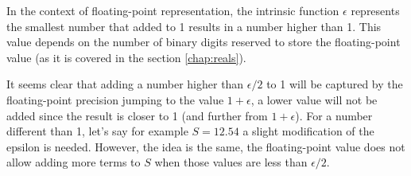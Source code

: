 In the context of floating-point representation, the intrinsic function $\epsilon$ represents the smallest 
number that added to 1 results in a number higher than 1.
This value depends on the number of binary digits reserved to store the floating-point
value (as it is covered in the section \ref{chap:reals}). 

It seems clear that adding a number higher than $\epsilon/2$ to 1
will be captured by the floating-point precision jumping to the value $1 + \epsilon$, a lower value will not be added
since the result is closer to 1 (and further from $1 + \epsilon$). For a number different than 1, let's say for example $S = 12.54$ a slight 
modification of the epsilon is needed. However, the idea is the same, the floating-point value does not allow 
adding more terms to $ S $ when those values are less than $\epsilon/2$. 






%
%
%
%
%
%




